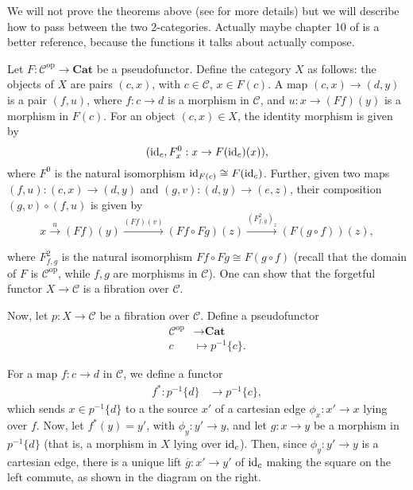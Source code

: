 \documentclass{MetricNotes2023}
\def\id{\ensuremath\text{id}}
\begin{document}
We will not prove the theorems above (see \autocite{monoidalgrothendieck} for more details) but we will describe how to pass between the two \(2\)-categories. Actually maybe chapter 10 of \autocite{2dimensional} is a better reference, because the functions it talks about actually compose. 

Let \(F : \mathcal{C}^{\text{op}} \to \textbf{Cat}\) be a pseudofunctor. Define the category \(X\) as follows: the objects of \(X\) are pairs \((c, x)\), with \(c \in \mathcal{C}\), \(x \in F(c)\). A map \((c, x)\to (d, y)\) is a pair \((f, u)\), where \(f : c \to d\) is a morphism in \(\mathcal{C}\), and \(u : x\to (Ff)(y)\) is a morphism in \(F(c)\). For an object \((c, x) \in X\), the identity morphism is given by
\[(\id_c, F^0_x : x \to F(\id_c)(x)),\]
where \(F^0\) is the natural isomorphism \(\id_{F(c)} \cong F(\id_c)\). Further, given two maps \((f, u) : (c, x) \to (d, y)\) and \((g, v) : (d, y)\to (e, z)\), their composition \((g,v)\circ (f, u)\) is given by
\[x \xrightarrow{u} (Ff)(y)\xrightarrow{(Ff)(v)} (Ff \circ Fg)(z) \xrightarrow{\left(F^2_{f,g}\right)_z} (F(g\circ f))(z),\]

where \(F^2_{f, g}\) is the natural isomorphism \(Ff \circ Fg \cong F(g \circ f)\) (recall that the domain of \(F\) is \(\mathcal{C}^{\text{op}}\), while \(f, g\) are morphisms in \(\mathcal{C}\)). One can show that the forgetful functor \(X \to \mathcal{C}\) is a fibration over \(\mathcal{C}\). 

Now, let \(p : X\to \mathcal{C}\) be a fibration over \(\mathcal{C}\). Define a pseudofunctor 
\begin{align*}
\mathcal{C}^{\text{op}}&\to \textbf{Cat}\\
c &\mapsto p^{-1}\{c\}.
\end{align*}

For a map \(f : c \to d\) in \(\mathcal{C}\), we define a functor 
\begin{align*}
f^* : p^{-1}\{d\}&\to p^{-1}\{c\},
\end{align*}
which sends \(x \in p^{-1}\{d\}\) to a the source \(x'\) of a cartesian edge \(\phi_x : x' \to x\) lying over \(f\). Now, let \(f^*(y)=y'\), with \(\phi_y : y' \to y\), and let \(g : x \to y\) be a morphism in \(p^{-1}\{d\}\) (that is, a morphism in \(X\) lying over \(\id_c\)). Then, since \(\phi_y : y' \to y\) is a cartesian edge, there is a unique lift \(\overline g : x' \to y'\) of \(\id_c\) making the square on the left commute, as shown in the diagram on the right. 
\end{document}
